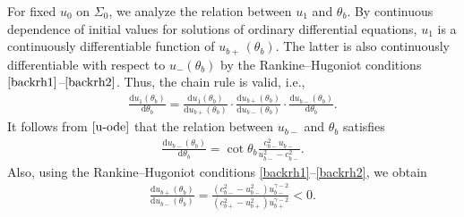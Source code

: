 \documentclass[reqno,12pt]{amsart}
\newcommand{\dd}{\mathrm{d}}
\numberwithin{equation}{section}
\begin{document}
For fixed $u_0$ on $\Sigma_0$, we analyze the relation between $u_1$ and $\theta_b$. By continuous dependence of initial values for solutions of ordinary differential equations, $u_1$ is a continuously differentiable function of $u_{b+}\, (\theta_b)$. The latter is also continuously differentiable with respect to $u_-(\theta_b)$ by the Rankine–Hugoniot conditions $\eqref{backrh1}$--$ \eqref{backrh2}$. Thus, the chain rule is valid, i.e.,
	\begin{align*}
		\frac{\dd u_1(\theta_b)}{\dd \theta_b }=\frac{\dd u_1(\theta_b)}{\dd u_{b+}(\theta_b) }\cdot\frac{\dd u_{b+}(\theta_b)}{\dd u_{b-}(\theta_b) }\cdot\frac{\dd u_{b-}(\theta_b)}{\dd \theta_b }.
	\end{align*}
It follows from $\eqref{u-ode}$ that the relation between $u_{b-}$ and $\theta_b$ satisfies
	\begin{align}
		\frac{\dd u_{b-}(\theta_b)}{\dd \theta_b }=\cot\theta_b\frac{c_{b-}^2u_{b-}}{u_{b-}^2-c_{b-}^2}.\label{du-dtheta}
	\end{align}
Also, using the Rankine–Hugoniot conditions \eqref{backrh1}--\eqref{backrh2}, we obtain
	\begin{align}
	\frac{\dd u_{b+}(\theta_b)}{\dd u_{b-}(\theta_b) }=\frac{(c_{b-}^2-u_{b-}^2)u_{b-}^{\gamma-2}}{(c_{b+}^2-u_{b+}^2)u_{b+}^{\gamma-2}}<0.\label{du+du-}
	\end{align}
\end{document}
